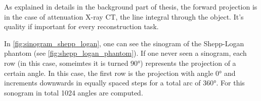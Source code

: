 
As explained in details in the background part of thesis, the forward projection is in the case of
attenuation X-ray CT, the line integral through the object. It's quality if important for every
reconstruction task.


In \autoref{fig:sinogram_shepp_logan}, one can see the sinogram of the Shepp-Logan phantom
 (see \autoref{fig:shepp_logan_phantom}). If one never
seen a sinogram, each row (in this case, someimtes it is turned 90°) represents the projection of a
certain angle. In this case, the first row is the projection with angle 0° and increments downwards
in equally spaced steps for a total arc of 360°. For this sonogram in total 1024 angles are
computed.

